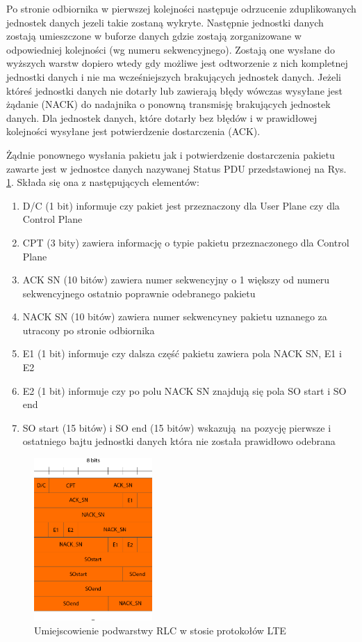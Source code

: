 Po stronie odbiornika w pierwszej kolejności następuje odrzucenie zduplikowanych jednostek danych jezeli takie zostaną wykryte. Następnie jednostki danych zostają umieszczone w buforze danych gdzie zostają zorganizowane w odpowiedniej kolejności (wg numeru sekwencyjnego). Zostają one wysłane do wyższych warstw dopiero wtedy gdy możliwe jest odtworzenie z nich kompletnej jednostki danych i nie ma wcześniejszych brakujących jednostek danych. Jeżeli któreś jednostki danych nie dotarły lub zawierają błędy wówczas wysyłane jest żądanie (NACK) do nadajnika o ponowną transmisję brakujących jednostek danych. Dla jednostek danych, które dotarły bez błędów i w prawidłowej kolejności wysyłane jest potwierdzenie dostarczenia (ACK).

Żądnie ponownego wysłania pakietu jak i potwierdzenie dostarczenia pakietu zawarte jest w jednostce danych nazywanej Status PDU przedstawionej na Rys. \ref{fig:status_pdu}. Składa się ona z następujących elementów:

\begin{enumerate}
	\item D/C (1 bit) informuje czy pakiet jest przeznaczony dla User Plane czy dla Control Plane
	\item CPT (3 bity) zawiera informację o typie pakietu przeznaczonego dla Control Plane
	\item ACK SN (10 bitów) zawiera numer sekwencyjny o 1 większy od numeru sekwencyjnego ostatnio poprawnie odebranego pakietu
	\item NACK SN (10 bitów) zawiera numer sekwencyney pakietu uznanego za utracony po stronie odbiornika
	\item E1 (1 bit) informuje czy dalsza część pakietu zawiera pola NACK SN, E1 i E2
	\item E2 (1 bit) informuje czy po polu NACK SN znajdują się pola SO start i SO end
	\item SO start (15 bitów) i SO end (15 bitów) wskazują na pozycję pierwsze i ostatniego bajtu jednostki danych która nie została prawidłowo odebrana
\end{enumerate}

\begin{figure}
	\centerline{\includegraphics[width=0.4\textwidth]{images/rlc_status_pdu.png}}
	\caption{Umiejscowienie podwarstwy RLC w stosie protokołów LTE}
	\label{fig:status_pdu}
\end{figure}


